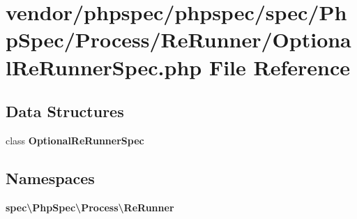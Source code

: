 \section{vendor/phpspec/phpspec/spec/\+Php\+Spec/\+Process/\+Re\+Runner/\+Optional\+Re\+Runner\+Spec.php File Reference}
\label{_optional_re_runner_spec_8php}
\subsection*{Data Structures}
\begin{DoxyCompactItemize}
\item 
class {\bf Optional\+Re\+Runner\+Spec}
\end{DoxyCompactItemize}
\subsection*{Namespaces}
\begin{DoxyCompactItemize}
\item 
 {\bf spec\textbackslash{}\+Php\+Spec\textbackslash{}\+Process\textbackslash{}\+Re\+Runner}
\end{DoxyCompactItemize}
